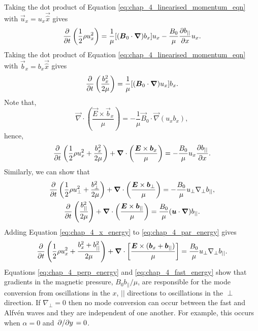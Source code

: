 Taking the dot product of Equation \eqref{eq:chap_4_linearised_momentum_eqn} with $\vec{u}_x=u_x\vec{\hat{x}}$ gives
\[\pdv{}{t}\left(\frac{1}{2}\rho u_x^2\right)=\frac{1}{\mu}[(\boldsymbol{B}_0\cdot\boldsymbol{\nabla})b_x]u_x-\frac{B_0}{\mu}\pdv{b_{||}}{x}u_x.\]
Taking the dot product of Equation \eqref{eq:chap_4_linearised_momentum_eqn} with $\vec{b}_x=b_x\vec{\hat{x}}$ gives
\[\pdv{}{t}\left(\frac{b_x^2}{2\mu}\right)=\frac{1}{\mu}[(\boldsymbol{B}_0\cdot\boldsymbol{\nabla})u_x]b_x.\]
Note that,
\[\vec{\nabla}\cdot\left(\frac{\vec{E}\times\vec{b}_x}{\mu}\right)=-\frac{1}{\mu}\vec{B}_0\cdot\vec{\nabla}(u_xb_x),\]
hence,
\begin{equation}
    \label{eq:chap_4_x_energy}
    \pdv{}{t}\left(\frac{1}{2}\rho u_x^2+\frac{b_x^2}{2\mu}\right)+\boldsymbol{\nabla}\cdot\left(\frac{\boldsymbol{E}\times\boldsymbol{b}_x}{\mu}\right)=-\frac{B_0}{\mu}u_x\pdv{b_{||}}{x}.
\end{equation}
Similarly, we can show that
\begin{gather}
    \label{eq:chap_4_perp_energy}
    \pdv{}{t}\left(\frac{1}{2}\rho u_\perp^2+\frac{b_\perp^2}{2\mu}\right)+\boldsymbol{\nabla}\cdot\left(\frac{\boldsymbol{E}\times\boldsymbol{b}_\perp}{\mu}\right)=-\frac{B_0}{\mu}u_\perp\nabla_\perp b_{||}, \\
    \label{eq:chap_4_par_energy}
    \pdv{}{t}\left(\frac{b_{||}^2}{2\mu}\right)+\boldsymbol{\nabla}\cdot\left(\frac{\boldsymbol{E}\times\boldsymbol{b}_{||}}{\mu}\right)=\frac{B_0}{\mu}(\boldsymbol{u}\cdot\boldsymbol{\nabla})b_{||}.
\end{gather}
Adding Equation \eqref{eq:chap_4_x_energy} to \eqref{eq:chap_4_par_energy} gives
\begin{equation}
    \label{eq:chap_4_fast_energy}
    \pdv{}{t}\left(\frac{1}{2}\rho u_x^2+\frac{b_x^2+b_{||}^2}{2\mu}\right)+\boldsymbol{\nabla}\cdot\left[\frac{\boldsymbol{E}\times(\boldsymbol{b}_x+\boldsymbol{b}_{||})}{\mu}\right]=\frac{B_0}{\mu}u_\perp\nabla_\perp b_{||}.
\end{equation}
Equations \eqref{eq:chap_4_perp_energy} and \eqref{eq:chap_4_fast_energy} show that gradients in the magnetic pressure, $B_0b_{||}/\mu$, are responsible for the mode conversion from oscillations in the $x$, $||$ directions to oscillations in the $\perp$ direction. If $\nabla_\perp = 0$ then no mode conversion can occur between the fast and Alfv\'en waves and they are independent of one another. For example, this occurs when $\alpha=0$ and $\pdv*{}{y}=0$.

